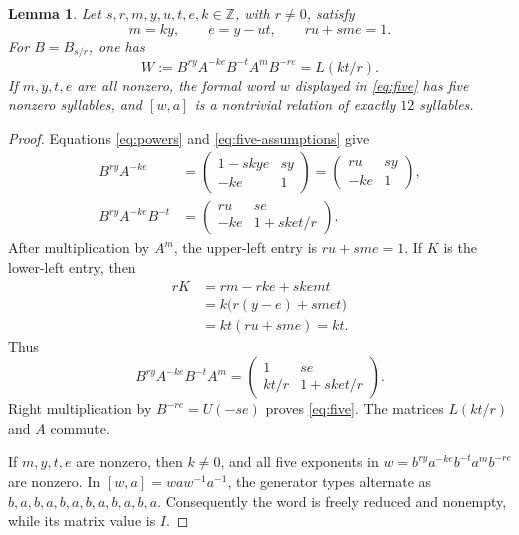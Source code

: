 \documentclass[11pt]{article}
\newtheorem{lemma}[theorem]{Lemma}
\theoremstyle{definition}
\theoremstyle{remark}
\numberwithin{equation}{section}
\newcommand{\Z}{\mathbb Z}
\begin{document}
\begin{lemma}\label{lem:five}
Let $s,r,m,y,u,t,e,k\in\Z$, with $r\ne0$, satisfy
\begin{equation}\label{eq:five-assumptions}
 m=ky,\qquad e=y-ut,\qquad ru+sme=1.
\end{equation}
For $B=B_{s/r}$, one has
\begin{equation}\label{eq:five}
 W:=B^{ry}A^{-ke}B^{-t}A^mB^{-re}=L(kt/r).
\end{equation}
If $m,y,t,e$ are all nonzero, the formal word $w$ displayed in
\eqref{eq:five} has five nonzero syllables, and $[w,a]$ is a
nontrivial relation of exactly $12$ syllables.
\end{lemma}
\begin{proof}
Equations \eqref{eq:powers} and \eqref{eq:five-assumptions} give
\begin{align*}
 B^{ry}A^{-ke}
 &=\begin{pmatrix}1-skye&sy\\-ke&1\end{pmatrix}
  =\begin{pmatrix}ru&sy\\-ke&1\end{pmatrix},\\
 B^{ry}A^{-ke}B^{-t}
 &=\begin{pmatrix}ru&se\\-ke&1+sket/r\end{pmatrix}.
\end{align*}
After multiplication by $A^m$, the upper-left entry is $ru+sme=1$.
If $K$ is the lower-left entry, then
\begin{align*}
 rK&=rm-rke+skemt\\
   &=k\bigl(r(y-e)+smet\bigr)\\
   &=kt(ru+sme)=kt.
\end{align*}
Thus
\[
 B^{ry}A^{-ke}B^{-t}A^m
 =\begin{pmatrix}1&se\\kt/r&1+sket/r\end{pmatrix}.
\]
Right multiplication by $B^{-re}=U(-se)$ proves \eqref{eq:five}.
The matrices $L(kt/r)$ and $A$ commute.

If $m,y,t,e$ are nonzero, then $k\ne0$, and all five exponents in
$w=b^{ry}a^{-ke}b^{-t}a^mb^{-re}$ are nonzero. In
$[w,a]=waw^{-1}a^{-1}$, the generator types alternate as
$b,a,b,a,b,a,b,a,b,a,b,a$. Consequently the word is freely
reduced and nonempty, while its matrix value is $I$.
\end{proof}
\end{document}
